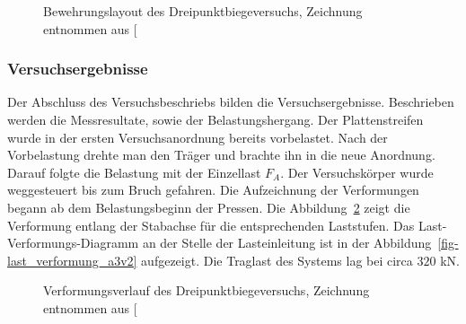 \documentclass[
  11pt,
  letterpaper,
]{scrreprt}
\begin{document}
\begin{figure}[H]


\caption{\label{fig-bewehrung_a3v2}Bewehrungslayout des
Dreipunktbiegeversuchs, Zeichnung entnommen aus
{[}\citeproc{ref-jager_versuche_2006}{2}{]}}

\end{figure}%

\subsubsection{Versuchsergebnisse}\label{versuchsergebnisse}

Der Abschluss des Versuchsbeschriebs bilden die Versuchsergebnisse.
Beschrieben werden die Messresultate, sowie der Belastungshergang. Der
Plattenstreifen wurde in der ersten Versuchsanordnung bereits
vorbelastet. Nach der Vorbelastung drehte man den Träger und brachte ihn
in die neue Anordnung. Darauf folgte die Belastung mit der Einzellast
\(F_A\). Der Versuchskörper wurde weggesteuert bis zum Bruch gefahren.
Die Aufzeichnung der Verformungen begann ab dem Belastungsbeginn der
Pressen. Die Abbildung~\ref{fig-verformungslinie_a3v2} zeigt die
Verformung entlang der Stabachse für die entsprechenden Laststufen. Das
Last-Verformungs-Diagramm an der Stelle der Lasteinleitung ist in der
Abbildung~\ref{fig-last_verformung_a3v2} aufgezeigt. Die Traglast des
Systems lag bei circa \(320\) kN.

\begin{figure}[H]


\caption{\label{fig-verformungslinie_a3v2}Verformungsverlauf des
Dreipunktbiegeversuchs, Zeichnung entnommen aus
{[}\citeproc{ref-jager_versuche_2006}{2}{]}}

\end{figure}%
\end{document}
